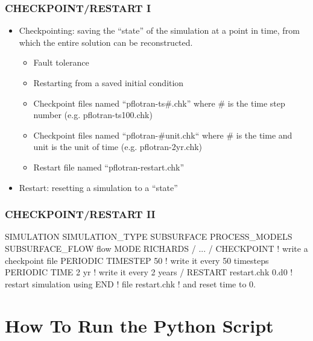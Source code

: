 \documentclass{beamer}
\newcommand\redcomment[1]{{{\color{red} #1}}}
\newcommand\bluecomment[1]{{{\color{blue} #1}}}
\begin{document}
\begin{frame}[fragile]\frametitle{CHECKPOINT/RESTART I}

\begin{itemize}
\item Checkpointing: saving the ``state'' of the simulation at a point in time, from which the entire solution can be reconstructed.
  \begin{itemize}
    \item Fault tolerance
    \item Restarting from a saved initial condition
    \item Checkpoint files named ``pflotran-ts\#.chk'' where \# is the time step number (e.g. pflotran-ts100.chk)
    \item Checkpoint files named ``pflotran-\#unit.chk`` where \# is the time and unit is the unit of time (e.g. pflotran-2yr.chk)
    \item Restart file named ``pflotran-restart.chk''
  \end{itemize}
\item Restart: resetting a simulation to a ``state''
\end{itemize}

\end{frame}

\begin{frame}[fragile]\frametitle{CHECKPOINT/RESTART II}

\begin{semiverbatim}

SIMULATION
  SIMULATION_TYPE SUBSURFACE
  PROCESS_MODELS
    SUBSURFACE_FLOW flow
      MODE RICHARDS
    /
    ...
  /
  CHECKPOINT               \bluecomment{! write a checkpoint file}
    PERIODIC TIMESTEP 50   \bluecomment{! write it every 50 timesteps}
    PERIODIC TIME 2 yr     \bluecomment{! write it every 2 years}
  /
  RESTART restart.chk \redcomment{0.d0}  \bluecomment{! restart simulation using}
END                         \bluecomment{! file \redcomment{restart.chk}}
                            \bluecomment{! and reset time to 0.}

\end{semiverbatim}

\end{frame}


\section{How To Run the Python Script}
\end{document}
